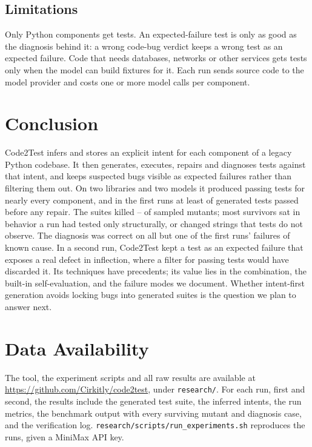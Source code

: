 \documentclass[11pt]{article}
\newcommand{\toolname}{Code2Test}
\newcommand{\code}[1]{\texttt{#1}}
\begin{document}
\subsection{Limitations}
Only Python components get tests.
An expected-failure test is only as good as the diagnosis behind it: a wrong code-bug verdict keeps a wrong test as an expected failure.
Code that needs databases, networks or other services gets tests only when the model can build fixtures for it.
Each run sends source code to the model provider and costs one or more model calls per component.

\section{Conclusion}

\toolname{} infers and stores an explicit intent for each component of a legacy Python codebase.
It then generates, executes, repairs and diagnoses tests against that intent, and keeps suspected bugs visible as expected failures rather than filtering them out.
On two libraries and two models it produced passing tests for nearly every component, and in the first runs at least \MinFirstRate{} of generated tests passed before any repair.
The suites killed \MinMutationScore--\MaxMutationScore{} of sampled mutants; most survivors sat in behavior a run had tested only structurally, or changed strings that tests do not observe.
The diagnosis was correct on all but one of the first runs' failures of known cause.
In a second run, \toolname{} kept a test as an expected failure that exposes a real defect in inflection, where a filter for passing tests would have discarded it.
Its techniques have precedents; its value lies in the combination, the built-in self-evaluation, and the failure modes we document.
Whether intent-first generation avoids locking bugs into generated suites is the question we plan to answer next.

\section*{Data Availability}
The tool, the experiment scripts and all raw results are available at \url{https://github.com/Cirkitly/code2test}, under \code{research/}.
For each run, first and second, the results include the generated test suite, the inferred intents, the run metrics, the benchmark output with every surviving mutant and diagnosis case, and the verification log.
\code{research/scripts/run\_experiments.sh} reproduces the runs, given a MiniMax API key.



\end{document}
